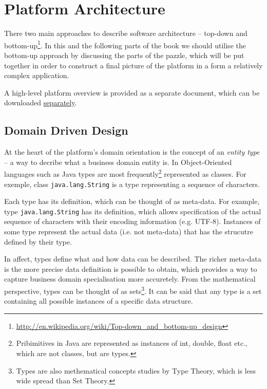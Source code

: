 \chapter{Platform Architecture}\label{ch01:01}

  There two main approaches to describe software architecture -- top-down and bottom-up\footnote{\url{http://en.wikipedia.org/wiki/Top-down_and_bottom-up_design}}.
  In this and the following parts of the book we should utilise the bottom-up approach by discussing the parts of the pazzle, which will be put together in order to construct a final picture of the platform in a form a relatively complex application.

  A high-level platform overview is provided as a separate document, which can be downloaded \href{http://www.fielden.com.ua/trac/pnl-tg/attachment/wiki/WikiStart/architecture-overview.pdf}{separately}.

\section{Domain Driven Design}

  At the heart of the platform's domain orientation is the concept of an \emph{entity type} -- a way to decribe what a business domain entity is.
  In Object-Oriented languages such as Java types are most frequently\footnote{Pribimitives in Java are represented as instances of int, double, float etc., which are not classes, but are types.} represented as classes.
  For exemple, class \texttt{java.lang.String} is a type representing a sequence of characters.
  
  Each type has its definition, which can be thought of as meta-data.
  For example, type \texttt{java.lang.String} has its definition, which allows specification of the actual sequence of characters with their encoding information (e.g. UTF-8).
  Instances of some type represent the actual data (i.e. not meta-data) that has the strucutre defined by their type.
  
  In affect, types define what and how data can be described.
  The richer meta-data is the more precise data definition is possible to obtain, which provides a way to capture business domain specialisation more accuretely.
  From the mathematical perspective, types can be thought of as sets\footnote{Types are also methematical concepts studies by Type Theory, which is less wide spread than Set Theory.}.
  It can be said that any type is a set containing all possible instances of a specific data structure.

